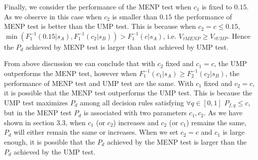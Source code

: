 Finally, we consider the performance of the MENP test when $c_1$ is fixed to $0.15$. As we observe in this case when $c_2$ is smaller than $0.15$ the performance of MENP test is better than the UMP test. This is because when $c_2 = c  \leq 0.15$, $\min (F_1^{-1}(0.15|s_A), F_1^{-1}(c_2|s_B)) > F_1^{-1}(c|s_A)$, i.e. $V_{\tau MENP} \geq V_{\tau UMP }$.   Hence the $P_d$ achieved by MENP test is larger than that achieved by UMP test. 


From above discussion we can conclude that with $c_2$ fixed and $c_1 = c$, the UMP outperforms the MENP test, however when $F_1^{-1}(c_1|s_A) \geq F_2^{-1}(c_2|s_B)$, the performance of MENP test and UMP test are the same. With $c_1$ fixed and $c_2  = c$, it is possible that the MENP test outperforms the UMP test. This is because the UMP test maximizes $P_d$ among all decision rules satisfying $\forall q \in [0, 1] $ $P_{f,q} \leq c$, but 
in the MENP test $P_d$ is associated with two parameters $c_1, c_2$.  As we have shown in section 3.3, when $c_1$ (or $c_2$) increases and $c_2$ (or $c_1$) remains the same, $P_d$ will either remain the same or increases. When we set $c_2 = c$ and $c_1$ is large enough, it is possible that the $P_d$ achieved by the MENP test is larger than the $P_d$ achieved by the UMP test.
\typeout{}

